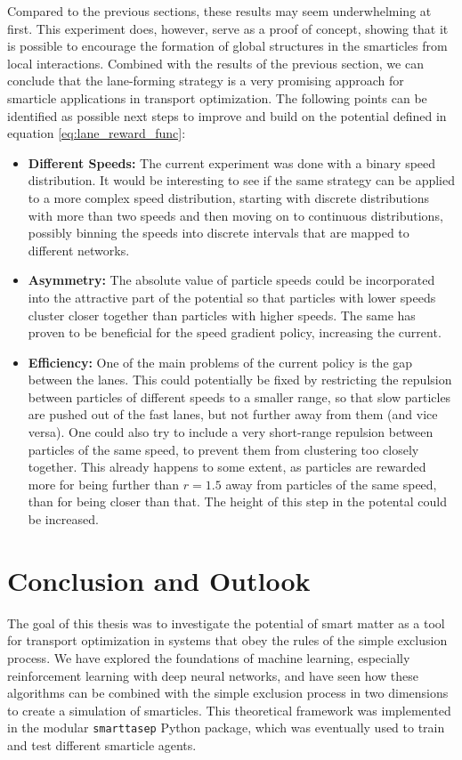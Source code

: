 Compared to the previous sections, these results may seem underwhelming at first. This experiment does, however, serve as a proof of concept, showing that it is possible to encourage the formation of global structures in the smarticles from local interactions. Combined with the results of the previous section, we can conclude that the lane-forming strategy is a very promising approach for smarticle applications in transport optimization. The following points can be identified as possible next steps to improve and build on the potential defined in equation \ref{eq:lane_reward_func}:
\begin{itemize}
    \item \textbf{Different Speeds:} The current experiment was done with a binary speed distribution. It would be interesting to see if the same strategy can be applied to a more complex speed distribution, starting with discrete distributions with more than two speeds and then moving on to continuous distributions, possibly binning the speeds into discrete intervals that are mapped to different networks. 
    \item \textbf{Asymmetry:} The absolute value of particle speeds could be incorporated into the attractive part of the potential so that particles with lower speeds cluster closer together than particles with higher speeds. The same has proven to be beneficial for the speed gradient policy, increasing the current.
    \item \textbf{Efficiency:} One of the main problems of the current policy is the gap between the lanes. This could potentially be fixed by restricting the repulsion between particles of different speeds to a smaller range, so that slow particles are pushed out of the fast lanes, but not further away from them (and vice versa). One could also try to include a very short-range repulsion between particles of the same speed, to prevent them from clustering too closely together. This already happens to some extent, as particles are rewarded more for being further than $r=1.5$ away from particles of the same speed, than for being closer than that. The height of this step in the potental could be increased. 
\end{itemize}

\chapter{Conclusion and Outlook}
\label{chap:conclusion}
The goal of this thesis was to investigate the potential of smart matter as a tool for transport optimization in systems that obey the rules of the simple exclusion process. We have explored the foundations of machine learning, especially reinforcement learning with deep neural networks, and have seen how these algorithms can be combined with the simple exclusion process in two dimensions to create a simulation of smarticles. This theoretical framework was implemented in the modular \texttt{smarttasep} Python package, which was eventually used to train and test different smarticle agents.


